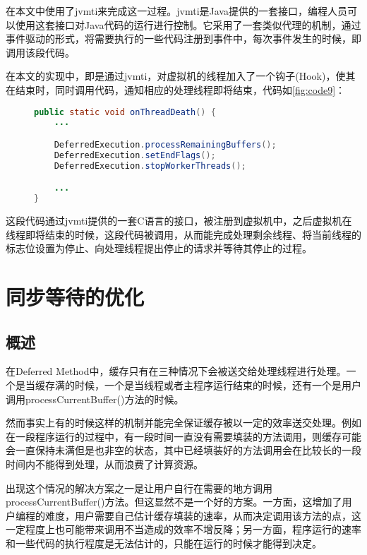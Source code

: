 在本文中使用了jvmti来完成这一过程。jvmti是Java提供的一套接口，编程人员可以使用这套接口对Java代码的运行进行控制。它采用了一套类似代理的机制，通过事件驱动的形式，将需要执行的一些代码注册到事件中，每次事件发生的时候，即调用该段代码。

在本文的实现中，即是通过jvmti，对虚拟机的线程加入了一个钩子(Hook)，使其在结束时，同时调用代码，通知相应的处理线程即将结束，代码如\ref{fig:code9}：

\begin{figure}[!htp]
\begin{lstlisting}[language=Java]
public static void onThreadDeath() {
	...

	DeferredExecution.processRemainingBuffers();
	DeferredExecution.setEndFlags();
	DeferredExecution.stopWorkerThreads();

	...
}
\end{lstlisting}
\end{figure}

这段代码通过jvmti提供的一套C语言的接口，被注册到虚拟机中，之后虚拟机在线程即将结束的时候，这段代码被调用，从而能完成处理剩余线程、将当前线程的标志位设置为停止、向处理线程提出停止的请求并等待其停止的过程。

\section{同步等待的优化}

\subsection{概述}

在Deferred Method中，缓存只有在三种情况下会被送交给处理线程进行处理。一个是当缓存满的时候，一个是当线程或者主程序运行结束的时候，还有一个是用户调用processCurrentBuffer()方法的时候。

然而事实上有的时候这样的机制并能完全保证缓存被以一定的效率送交处理。例如在一段程序运行的过程中，有一段时间一直没有需要填装的方法调用，则缓存可能会一直保持未满但是也非空的状态，其中已经填装好的方法调用会在比较长的一段时间内不能得到处理，从而浪费了计算资源。

出现这个情况的解决方案之一是让用户自行在需要的地方调用processCurrentBuffer()方法。但这显然不是一个好的方案。一方面，这增加了用户编程的难度，用户需要自己估计缓存填装的速率，从而决定调用该方法的点，这一定程度上也可能带来调用不当造成的效率不增反降；另一方面，程序运行的速率和一些代码的执行程度是无法估计的，只能在运行的时候才能得到决定。


